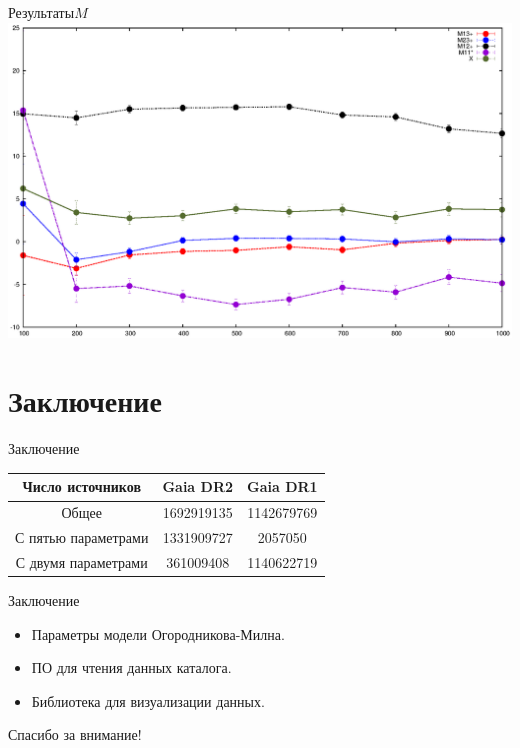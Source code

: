 \documentclass{beamer}
\begin{document}
\begin{frame}{Результаты}{$M$}
\includegraphics[width=1\linewidth]{./graphs/M100.eps}
\end{frame}

\section{Заключение}

\begin{frame}{Заключение}
\center\begin{tabular}{|c|c|c|}
\hline
Число источников&Gaia DR2&Gaia DR1\\
\hline
Общее&1692919135&1142679769\\
С пятью параметрами&1331909727&2057050\\
С двумя параметрами&361009408&1140622719\\
\hline
\end{tabular}
\end{frame}

\begin{frame}{Заключение}
\begin{itemize}
\item Параметры модели Огородникова-Милна.
\item ПО для чтения данных каталога.
\item Библиотека для визуализации данных.
\end{itemize}
\end{frame}

\begin{frame}
\center Спасибо за внимание!
\end{frame}
\end{document}
